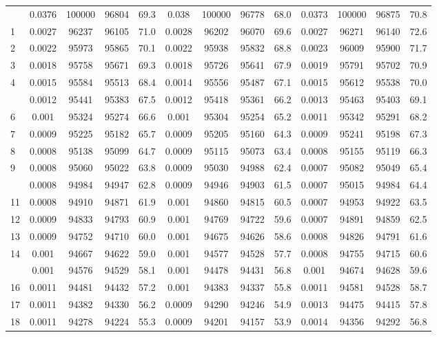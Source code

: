 \documentclass[
  14pt,
]{article}
\begin{document}
\begin{longtable}[t]{lcccccccccccc}
\endfoot
\bottomrule
\endlastfoot
0 & 0.0376 & 100000 & 96804 & 69.3 & 0.038 & 100000 & 96778 & 68.0 & 0.0373 & 100000 & 96875 & 70.8\\
1 & 0.0027 & 96237 & 96105 & 71.0 & 0.0028 & 96202 & 96070 & 69.6 & 0.0027 & 96271 & 96140 & 72.6\\
2 & 0.0022 & 95973 & 95865 & 70.1 & 0.0022 & 95938 & 95832 & 68.8 & 0.0023 & 96009 & 95900 & 71.7\\
3 & 0.0018 & 95758 & 95671 & 69.3 & 0.0018 & 95726 & 95641 & 67.9 & 0.0019 & 95791 & 95702 & 70.9\\
4 & 0.0015 & 95584 & 95513 & 68.4 & 0.0014 & 95556 & 95487 & 67.1 & 0.0015 & 95612 & 95538 & 70.0\\
\addlinespace
5 & 0.0012 & 95441 & 95383 & 67.5 & 0.0012 & 95418 & 95361 & 66.2 & 0.0013 & 95463 & 95403 & 69.1\\
6 & 0.001 & 95324 & 95274 & 66.6 & 0.001 & 95304 & 95254 & 65.2 & 0.0011 & 95342 & 95291 & 68.2\\
7 & 0.0009 & 95225 & 95182 & 65.7 & 0.0009 & 95205 & 95160 & 64.3 & 0.0009 & 95241 & 95198 & 67.3\\
8 & 0.0008 & 95138 & 95099 & 64.7 & 0.0009 & 95115 & 95073 & 63.4 & 0.0008 & 95155 & 95119 & 66.3\\
9 & 0.0008 & 95060 & 95022 & 63.8 & 0.0009 & 95030 & 94988 & 62.4 & 0.0007 & 95082 & 95049 & 65.4\\
\addlinespace
10 & 0.0008 & 94984 & 94947 & 62.8 & 0.0009 & 94946 & 94903 & 61.5 & 0.0007 & 95015 & 94984 & 64.4\\
11 & 0.0008 & 94910 & 94871 & 61.9 & 0.001 & 94860 & 94815 & 60.5 & 0.0007 & 94953 & 94922 & 63.5\\
12 & 0.0009 & 94833 & 94793 & 60.9 & 0.001 & 94769 & 94722 & 59.6 & 0.0007 & 94891 & 94859 & 62.5\\
13 & 0.0009 & 94752 & 94710 & 60.0 & 0.001 & 94675 & 94626 & 58.6 & 0.0008 & 94826 & 94791 & 61.6\\
14 & 0.001 & 94667 & 94622 & 59.0 & 0.001 & 94577 & 94528 & 57.7 & 0.0008 & 94755 & 94715 & 60.6\\
\addlinespace
15 & 0.001 & 94576 & 94529 & 58.1 & 0.001 & 94478 & 94431 & 56.8 & 0.001 & 94674 & 94628 & 59.6\\
16 & 0.0011 & 94481 & 94432 & 57.2 & 0.001 & 94383 & 94337 & 55.8 & 0.0011 & 94581 & 94528 & 58.7\\
17 & 0.0011 & 94382 & 94330 & 56.2 & 0.0009 & 94290 & 94246 & 54.9 & 0.0013 & 94475 & 94415 & 57.8\\
18 & 0.0011 & 94278 & 94224 & 55.3 & 0.0009 & 94201 & 94157 & 53.9 & 0.0014 & 94356 & 94292 & 56.8\\

\end{longtable}
\end{document}
